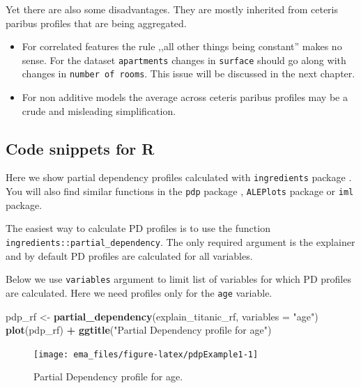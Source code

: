 \documentclass[12pt,]{krantz}
\newenvironment{Shaded}{\begin{snugshade}}{\end{snugshade}}
\newcommand{\DataTypeTok}[1]{\textcolor[rgb]{0.13,0.29,0.53}{#1}}
\newcommand{\KeywordTok}[1]{\textcolor[rgb]{0.13,0.29,0.53}{\textbf{#1}}}
\newcommand{\NormalTok}[1]{#1}
\newcommand{\OperatorTok}[1]{\textcolor[rgb]{0.81,0.36,0.00}{\textbf{#1}}}
\newcommand{\StringTok}[1]{\textcolor[rgb]{0.31,0.60,0.02}{#1}}
\providecommand{\tightlist}{%
  \setlength{\itemsep}{0pt}\setlength{\parskip}{0pt}}
\begin{document}
Yet there are also some disadvantages. They are mostly inherited from ceteris paribus profiles that are being aggregated.

\begin{itemize}
\tightlist
\item
  For correlated features the rule ,,all other things being constant'' makes no sense. For the dataset \texttt{apartments} changes in \texttt{surface} should go along with changes in \texttt{number\ of\ rooms}. This issue will be discussed in the next chapter.
\item
  For non additive models the average across ceteris paribus profiles may be a crude and misleading simplification.
\end{itemize}

\hypertarget{PDPR}{%
\subsection{Code snippets for R}\label{PDPR}}

Here we show partial dependency profiles calculated with \texttt{ingredients} package \citep{ingredientsRPackage}. You will also find similar functions in the \texttt{pdp} package \citep{pdpRPackage}, \texttt{ALEPlots} package \citep{ALEPlotRPackage} or \texttt{iml} \citep{imlRPackage} package.

The easiest way to calculate PD profiles is to use the function \texttt{ingredients::partial\_dependency}.
The only required argument is the explainer and by default PD profiles are calculated for all variables.

Below we use \texttt{variables} argument to limit list of variables for which PD profiles are calculated. Here we need profiles only for the \texttt{age} variable.

\begin{Shaded}
\begin{Highlighting}[]
\NormalTok{pdp_rf <-}\StringTok{ }\KeywordTok{partial_dependency}\NormalTok{(explain_titanic_rf, }\DataTypeTok{variables =} \StringTok{"age"}\NormalTok{)}
\KeywordTok{plot}\NormalTok{(pdp_rf) }\OperatorTok{+}
\StringTok{  }\KeywordTok{ggtitle}\NormalTok{(}\StringTok{"Partial Dependency profile for age"}\NormalTok{) }
\end{Highlighting}
\end{Shaded}

\begin{figure}

{\centering \texttt{[image: ema\_files/figure-latex/pdpExample1-1]} 

}

\caption{Partial Dependency profile for age.}\label{fig:pdpExample1}
\end{figure}
\end{document}

